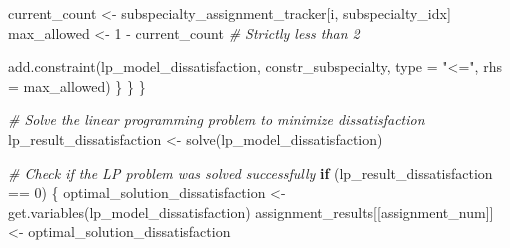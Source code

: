 \documentclass[
]{article}
\newenvironment{Shaded}{\begin{snugshade}}{\end{snugshade}}
\newcommand{\AttributeTok}[1]{\textcolor[rgb]{0.77,0.63,0.00}{#1}}
\newcommand{\CommentTok}[1]{\textcolor[rgb]{0.56,0.35,0.01}{\textit{#1}}}
\newcommand{\ControlFlowTok}[1]{\textcolor[rgb]{0.13,0.29,0.53}{\textbf{#1}}}
\newcommand{\DecValTok}[1]{\textcolor[rgb]{0.00,0.00,0.81}{#1}}
\newcommand{\FunctionTok}[1]{\textcolor[rgb]{0.00,0.00,0.00}{#1}}
\newcommand{\NormalTok}[1]{#1}
\newcommand{\OtherTok}[1]{\textcolor[rgb]{0.56,0.35,0.01}{#1}}
\newcommand{\SpecialCharTok}[1]{\textcolor[rgb]{0.00,0.00,0.00}{#1}}
\newcommand{\StringTok}[1]{\textcolor[rgb]{0.31,0.60,0.02}{#1}}
\begin{document}
\begin{Shaded}
\begin{Highlighting}[]
\NormalTok{      current\_count }\OtherTok{\textless{}{-}}\NormalTok{ subspecialty\_assignment\_tracker[i, subspecialty\_idx]}
\NormalTok{      max\_allowed }\OtherTok{\textless{}{-}} \DecValTok{1} \SpecialCharTok{{-}}\NormalTok{ current\_count  }\CommentTok{\# Strictly less than 2}
      
      \FunctionTok{add.constraint}\NormalTok{(lp\_model\_dissatisfaction, constr\_subspecialty, }\AttributeTok{type =} \StringTok{"\textless{}="}\NormalTok{, }\AttributeTok{rhs =}\NormalTok{ max\_allowed)}
\NormalTok{    \}}
\NormalTok{  \}}
\NormalTok{\}}
  
\CommentTok{\# Solve the linear programming problem to minimize dissatisfaction}
\NormalTok{lp\_result\_dissatisfaction }\OtherTok{\textless{}{-}} \FunctionTok{solve}\NormalTok{(lp\_model\_dissatisfaction)}

\CommentTok{\# Check if the LP problem was solved successfully}
\ControlFlowTok{if}\NormalTok{ (lp\_result\_dissatisfaction }\SpecialCharTok{==} \DecValTok{0}\NormalTok{) \{}
\NormalTok{    optimal\_solution\_dissatisfaction }\OtherTok{\textless{}{-}} \FunctionTok{get.variables}\NormalTok{(lp\_model\_dissatisfaction)}
\NormalTok{    assignment\_results[[assignment\_num]] }\OtherTok{\textless{}{-}}\NormalTok{ optimal\_solution\_dissatisfaction}
    

\end{Highlighting}
\end{Shaded}
\end{document}
